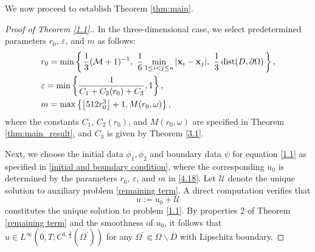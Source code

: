 \documentclass[11pt,reqno,oneside]{amsart}
\numberwithin{equation}{section}
\theoremstyle{definition}
\theoremstyle{remark}
\numberwithin{equation}{section}
\begin{document}
	We now proceed to establish Theorem \ref{thm:main}.
\begin{proof}[Proof of Theorem \ref{1.1}.]
	In the three-dimensional case, we select predetermined parameters $r_0$, $\varepsilon$, and $m$ as follows:
	\begin{equation}\label{4.18}
		\begin{aligned}
			&\hfill r_0 = \min\left\{\,
			\frac{1}{3}(\mathcal{M} + 1)^{-1},\ 
			\frac{1}{6}\min_{1 \le i < j \le n} |\mathbf{x}_i - \mathbf{x}_j|,\ 
			\frac{1}{3}\operatorname{dist}(D, \partial \Omega)
			\,\right\}, \\
			&\hfill \varepsilon = \min\left\{\frac{1}{C_1 + C_2(r_0) + C_3},1\right\}, \\
			&\hfill m = \max\left\{ \left\lfloor 512 r_0^3 \right\rfloor + 1,  M(r_0,\omega) \right\},
		\end{aligned}
	\end{equation}
	where the constants $C_1$, $C_2(r_0)$, and $M(r_0,\omega)$ are specified in Theorem \ref{thm:main_result}, and $C_3$ is given by Theorem \ref{3.1}.  
	
	Next, we choose the initial data $\phi_1,\phi_2$ and boundary data $\psi$ for equation \eqref{1.1} as specified in \eqref{initial and boundary condition}, where the corresponding $u_0$ is determined by the parameters $r_0$, $\varepsilon$, and $m$ in \eqref{4.18}. Let $\mathcal{U}$ denote the unique solution to auxiliary problem \eqref{remaining term}. A direct computation verifies that 
	\begin{equation}\label{eq 4.17}
		u := u_0 + \mathcal{U}
	\end{equation}	
	constitutes the unique solution to problem \eqref{1.1}. By properties 2 of Theorem \ref{remaining term} and the smoothness of $u_0$, it follows that $u \in L^\infty(0,T;C^{1,\frac{1}{2}}(\overline{\Omega^\prime}))$ for any $\Omega^\prime \Subset \Omega \backslash \overline{D}$ with Lipschitz boundary. 
	

\end{proof}
\end{document}
